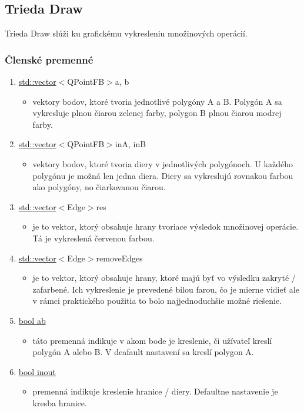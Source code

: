 \documentclass[12pt]{article}
\begin{document}
\subsection{Trieda Draw}
Trieda Draw slúži ku grafickému vykresleniu množinových operácií.

\subsubsection{Členské premenné}
\begin{enumerate}

\item[] \underline {std::vector}$<${QPointFB}$>${a, b}
\begin{itemize}
\item vektory bodov, ktoré tvoria  jednotlivé polygóny A a B. Polygón A sa vykresluje plnou čiarou zelenej farby, polygon B plnou čiarou modrej farby.
\end{itemize}

\item[] \underline {std::vector}$<${QPointFB}$>${inA, inB}
\begin{itemize}
\item vektory bodov, ktoré tvoria diery v jednotlivých polygónoch. U každého polygónu je možná len jedna diera. Diery sa vykreslujú rovnakou farbou ako polygóny, no čiarkovanou čiarou.
\end{itemize}

\item[] \underline {std::vector}$<${Edge}$>${res}
\begin{itemize}
\item je to vektor, ktorý obsahuje hrany tvoriace výsledok množinovej operácie. Tá je vykreslená červenou farbou.
\end{itemize}

\item[] \underline {std::vector}$<${Edge}$>${removeEdges}
\begin{itemize}
\item je to vektor, ktorý obsahuje hrany, ktoré majú byť vo výsledku zakryté / zafarbené. Ich vykreslenie je prevedené bilou farou, čo je mierne vidieť ale v rámci praktického použitia to bolo najjednoduchšie možné riešenie. 
\end{itemize}

\item[] \underline {bool ab}
\begin{itemize}
\item táto premenná indikuje v akom bode je kreslenie, či užívateľ kreslí polygón A alebo B. V deafault nastavení sa kreslí polygon A.
\end{itemize}

\item[] \underline {bool inout}
\begin{itemize}
\item premenná indikuje kreslenie hranice / diery. Defaultne nastavenie je kresba hranice.
\end{itemize}
\end{enumerate}
\end{document}
